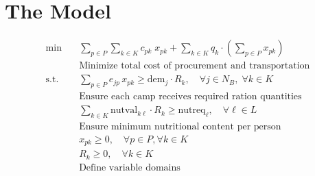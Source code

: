 \documentclass{article}
\begin{document}
\section{The Model}
\begin{align*}
    \min \quad & \sum_{p \in P} \sum_{k \in K} c_{pk} \; x_{pk} + \sum_{k \in K} q_k \cdot \left( \sum_{p \in P} x_{pk} \right) \\
    & \text{Minimize total cost of procurement and transportation} \\[6pt]
    \text{s.t.} \quad & \sum_{p \in P} e_{jp} \, x_{pk} \geq \mathrm{dem}_j \cdot R_k, \quad \forall j \in N_B,\; \forall k \in K \\
    & \text{Ensure each camp receives required ration quantities} \\[6pt]
    & \sum_{k \in K} \mathrm{nutval}_{k\ell} \cdot R_k \geq \mathrm{nutreq}_\ell, \quad \forall \ell \in L \\
    & \text{Ensure minimum nutritional content per person} \\[6pt]
    & x_{pk} \geq 0, \quad \forall p \in P, \forall k \in K \\
    & R_k \geq 0, \quad \forall k \in K \\
    & \text{Define variable domains}
\end{align*}
\end{document}
